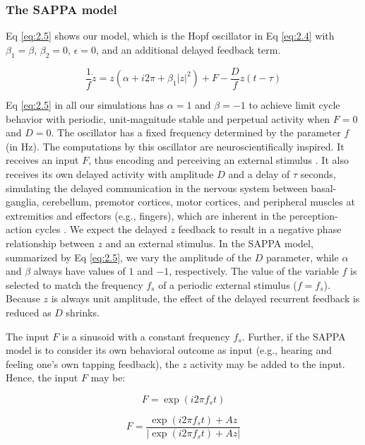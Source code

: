 \documentclass{report}
\begin{document}
\subsubsection{The SAPPA model}

Eq \eqref{eq:2.5} shows our model, which is the Hopf oscillator in Eq \eqref{eq:2.4} with $\beta_1 = \beta$, $\beta_2=0$, $\epsilon=0$, and an additional delayed feedback term. 

\begin{equation}
\frac{1}{f}\dot{z} = z(\alpha + i2\pi + \beta_1|z|^2) + F - \frac{D}{f}z(t-\tau) \label{eq:2.5}
\end{equation}

Eq \eqref{eq:2.5} in all our simulations has $\alpha=1$ and $\beta=-1$ to achieve limit cycle behavior with periodic, unit-magnitude stable and perpetual activity when $F = 0$ and $D = 0$. The oscillator has a fixed frequency determined by the parameter $f$ (in Hz). The computations by this oscillator are neuroscientifically inspired. It receives an input $F$, thus encoding and perceiving an external stimulus \cite{large2015neural}. It also receives its own delayed activity with amplitude $D$ and a delay of $\tau$ seconds, simulating the delayed communication in the nervous system between basal-ganglia, cerebellum, premotor cortices, motor cortices, and peripheral muscles at extremities and effectors (e.g., fingers), which are inherent in the perception-action cycles \cite{aschersleben1995synchronizing, prinz1992don}. We expect the delayed $z$ feedback to result in a negative phase relationship between $z$ and an external stimulus. In the SAPPA model, summarized by Eq \eqref{eq:2.5}, we vary the amplitude of the $D$ parameter, while $\alpha$ and $\beta$ always have values of $1$ and $-1$, respectively. The value of the variable $f$ is selected to match the frequency $f_s$ of a periodic external stimulus ($f = f_s$). Because $z$ is always unit amplitude, the effect of the delayed recurrent feedback is reduced as $D$ shrinks.

The input $F$ is a sinusoid with a constant frequency $f_s$. Further, if the SAPPA model is to consider its own behavioral outcome as input (e.g., hearing and feeling one's own tapping feedback), the $z$ activity may be added to the input. Hence, the input $F$ may be: 

\begin{equation}
F = \exp(i2\pi f_s t) \label{eq:2.6}
\end{equation}

\begin{equation}
F = \frac{\exp(i2\pi f_s t)+Az}{|\exp(i2\pi f_s t)+Az|} \label{eq:2.7}
\end{equation}
\end{document}
